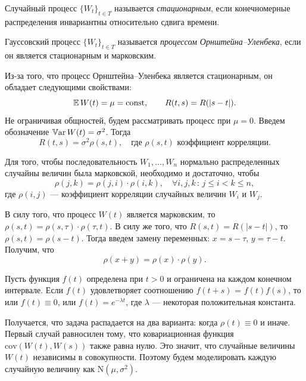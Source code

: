 \begin{definition}
        Случайный процесс $\{W_t\}_{t\in T}$ называется \textit{стационарным}, если конечномерные распределения инвариантны относительно сдвига времени.
\end{definition}

\begin{definition}
        Гауссовский процесс $\{W_t\}_{t\in T}$ называется \textit{процессом Орнштейна--Уленбека}, если он является стационарным и марковским.
\end{definition}

Из-за того, что процесс Орнштейна--Уленбека является стационарным, он обладает следующими свойствами:
$$
        \mathbb{E}\,W(t) = \mu = \mathrm{const},
\qquad
        R(t, s) = R(|s - t|).
$$
Не ограничивая общностей, будем рассматривать процесс при $\mu = 0$. Введем обозначение $\mathbb{V}\mbox{ar}\,W(t) = \sigma^2$. Тогда
$$
        R(t, s) = \sigma^2 \rho(s,t),
\quad
        \mbox{где } \rho(s,t)\mbox{ коэффициент корреляции.}
$$

\begin{theorem}
        Для того, чтобы последовательность $W_1, \ldots, W_n$ нормально распределенных случайны величин была марковской, необходимо и достаточно, чтобы
$$
        \rho(j,k) 
        = 
        \rho(j, i)
        \cdot
        \rho(i, k),
        \quad
        \forall i,j,k
        \,:\,
        j \leqslant i
        < k \leqslant n,
$$
где $\rho(i,j)$ --- коэффициент корреляции случайных величин $W_i$ и $W_j$.
\end{theorem}

В силу того, что процесс $W(t)$ является марковским, то
$
        \rho(s,t)
        =
        \rho(s,\tau)
        \cdot
        \rho(\tau, t)
$.
В силу же того, что $R(s,t) = R(|s - t|)$, то $\rho(s,t) = \rho(s - t)$.
Тогда введем замену переменных:
$
        x = s - \tau
$,
$
        y = \tau - t
$.
Получим, что
$$
        \rho(x + y)
        =
        \rho(x)
        \cdot
        \rho(y).
$$

\begin{theorem}
        Пусть функция $f(t)$ определена при $t > 0$ и ограничена на каждом конечном интервале. Если $f(t)$ удовлетворяет соотношению $f(t + s)$ = $f(t)f(s)$, то или $f(t) \equiv 0$, или $f(t) = e^{-\lambda t}$, где $\lambda$ --- некоторая положительная константа.
\end{theorem}

Получается, что задача распадается на два варианта: когда $\rho(t) \equiv 0$ и иначе. Первый случай равносилен тому, что ковариационная функция $\mathrm{cov} (W(t),W(s))$ также равна нулю. Это значит, что случайные величины $W(t)$ независимы в совокупности. Поэтому будем моделировать каждую случайную величину как $\mathrm{N}(\mu, \sigma^2)$.

